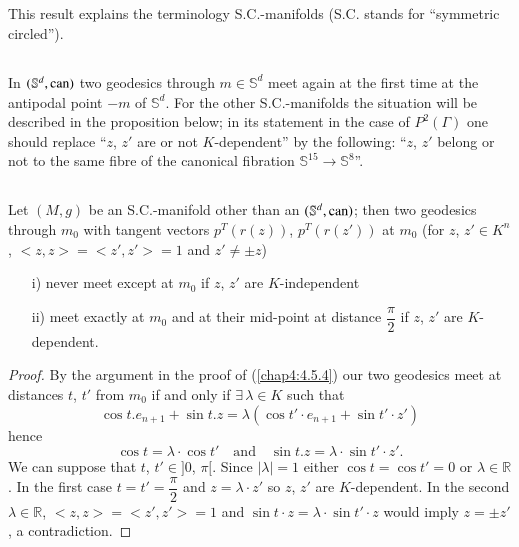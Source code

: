 \setcounter{subsection}{4}
\subsection{}\label{chap4:4.5.5}

This result explains the terminology S.C.-manifolds (S.C. stands for
``symmetric circled'').

\subsection{}\label{chap4:4.5.6}

\begin{remark*}
In $(\mathbb{S}^{d},\operatorname{can})$ two geodesics through $m\in\mathbb{S}^{d}$
meet again at the first time at the antipodal point $-m$ of
$\mathbb{S}^{d}$. For the other S.C.-manifolds the situation will be
described in the proposition below; in its statement in the case of
$P^{2}(\Gamma)$ one should replace ``$z$, $z'$ are or not
$K$-dependent'' by the following: ``$z$, $z'$ \pageoriginale belong or
not to the same fibre of the canonical fibration $\mathbb{S}^{15}\to
\mathbb{S}^{8}$''. 
\end{remark*}

\subsection{}\label{chap4:4.5.7}

\begin{prop*}
Let $(M,g)$ be an S.C.-manifold other than an $(\mathbb{S}^{d},\operatorname{can})$;
then two geodesics through $m_{0}$ with tangent vectors $p^{T}(r(z))$,
$p^{T}(r(z'))$ at $m_{0}$ (for $z$, $z'\in K^{n}$, $<z,z>=<z',z'>=1$
and $z'\neq \pm z$)
\begin{itemize}
\item[i)] never meet except at $m_{0}$ if $z$, $z'$ are
  $K$-independent

\item[ii)] meet exactly at $m_{0}$ and at their mid-point at distance
  $\dfrac{\pi}{2}$ if $z$, $z'$ are $K$-dependent.
\end{itemize}
\end{prop*}

\begin{proof}
By the argument in the proof of (\ref{chap4:4.5.4}) our two geodesics meet
at distances $t$, $t'$ from $m_{0}$ if and only if
$\exists\,\lambda\in K$ such that
$$
\cos t.e_{n+1}+\sin t.z=\lambda(\cos t'\cdot e_{n+1}+\sin t'\cdot z')
$$
hence
$$
\cos t=\lambda\cdot \cos t'\quad\text{and}\quad \sin t.z=\lambda\cdot
\sin t'\cdot z'.
$$
We can suppose that $t$, $t'\in ]0$, $\pi[$. Since $|\lambda|=1$
    either $\cos t=\cos t'=0$ or $\lambda\in\mathbb{R}$. In the first
    case $t=t'=\dfrac{\pi}{2}$ and $z=\lambda\cdot z'$ so $z$, $z'$
    are $K$-dependent. In the second $\lambda\in \mathbb{R}$,
    $<z,z>=<z',z'>=1$ and $\sin t\cdot z=\lambda\cdot \sin t'\cdot z$
    would imply $z=\pm z'$, a contradiction.
\end{proof}

